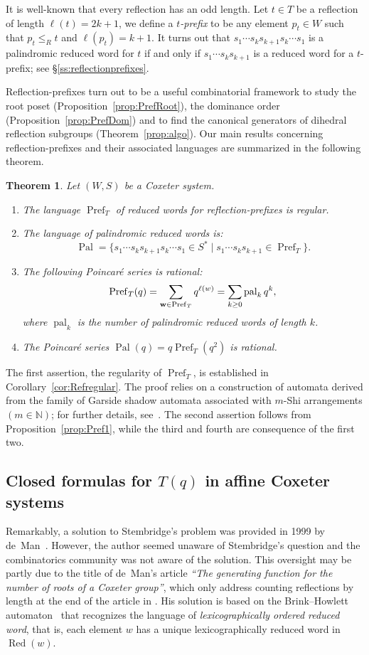 \documentclass{amsart}
\newtheorem{Theorem}{Theorem}[section]
\theoremstyle{definition}
\newcommand{\Red}{{\operatorname{Red}}}
\newcommand{\RPal}{\operatorname{Pal}}
\newcommand{\Pref}{\operatorname{Pref}}
\newcommand{\pal}{\operatorname{pal}}
\begin{document}
It is well-known that every reflection has an odd length. Let $t\in T$ be a reflection of length $\ell(t)=2k+1$, we define a {\em $t$-prefix} to be any element $p_t\in W$ such that $p_t\leq_R t$ and $\ell(p_t)=k+1$.
  It turns out that $ s_1\cdots s_k s_{k+1}  s_{k}\cdots  s_1$ is a palindromic reduced word for $t$  if and only if $s_1\cdots  s_k s_{k+1}$ is a reduced word for a $t$-prefix; see \S\ref{ss:reflectionprefixes}. 

Reflection-prefixes turn out to be a useful combinatorial framework to study the root poset (Proposition~\ref{prop:PrefRoot}), the dominance order (Proposition~\ref{prop:PrefDom}) and to find the canonical generators of dihedral reflection subgroups (Theorem~\ref{prop:algo}).  Our main results concerning reflection-prefixes and their associated languages are summarized in the following theorem.

\begin{Theorem}\label{thm:PrefMain} Let $(W,S)$ be a Coxeter system. 
\begin{enumerate}
\item The language $\Pref_T$ of reduced words for reflection-prefixes is regular.
\item The language of palindromic reduced words is:
$$
\RPal=\{s_1\cdots  s_k s_{k+1}  s_{k}\cdots  s_1 \in S^*\mid  s_1\cdots  s_k s_{k+1}\in\Pref_T\}.
$$
\item The following Poincar\'e series is rational:
$$
\Pref_T(q)=\sum_{\bold w \in \Pref_T} q^{\ell(w)}=\sum_{k\geq 0} \pal_kq^k,
$$
where $\pal_k$ is the number of palindromic reduced words of length $k$.

\item The Poincar\'e series $\RPal(q)=q\Pref_T(q^2)$ is rational.
\end{enumerate} 
\end{Theorem}

The first assertion, the regularity of $\Pref_T$, is established in Corollary~\ref{cor:Refregular}. The proof relies on a construction of automata derived from the family of Garside shadow automata associated with $m$-Shi arrangements $(m \in \mathbb{N})$; for further details, see~\cite{HNW, DFHM24}. The second assertion follows from Proposition~\ref{prop:Pref1}, while the third and fourth are consequence of the first two.

\subsection*{Closed formulas for $T(q)$ in affine Coxeter systems} Remarkably, a solution to Stembridge's problem was provided in 1999 by de~Man~\cite{DM}. However, the author seemed unaware of Stembridge's question and the combinatorics community was not aware of the solution. This oversight may be partly due to the title of de~Man's article {\em ``The generating function for the number of roots of a Coxeter group''}, which only address counting reflections by length at the end of the article in \cite[\S5.2]{DM}. His solution is based on the Brink--Howlett automaton~\cite{BH}  that recognizes the language of {\em lexicographically ordered reduced word}, that is, each element $w$ has a unique lexicographically reduced word in $\Red(w)$.  
\end{document}

